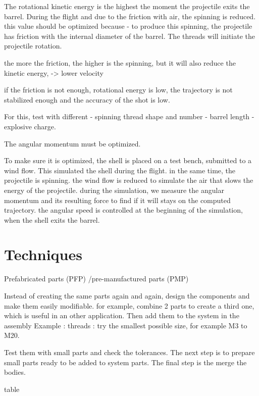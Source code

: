 \documentclass[12pt,a4paper]{article}
\begin{document}
	The rotational kinetic energy is the highest the moment the projectile exits the barrel. During the flight and due to the friction with air, the spinning is reduced.
	this value should be optimized because
	- to produce this spinning, the projectile has friction with the internal diameter of the barrel. The threads will initiate the projectile rotation. 
	
	the more the friction, the higher is the spinning, but it will also reduce the kinetic energy, -> lower velocity
	
	if the friction is not enough, rotational energy is low, the trajectory is not stabilized enough and the accuracy of the shot is low. 
	
	For this, test with different 
	- spinning thread shape and number
	- barrel length
	- explosive charge. 
	
	The angular momentum must be optimized.
	
	To make sure it is optimized, the shell is placed on a test bench, submitted to a wind flow. This simulated the shell during the flight. in the same time, the projectile is spinning. 
	the wind flow is reduced to simulate the air that slows the energy of the projectile. during the simulation, we measure the angular momentum and its resulting force to find if it will stays on the computed trajectory. 
	the angular speed is controlled at the beginning of the simulation, when the shell exits the barrel. 
	
	\newpage
	\section{Techniques}
	Prefabricated parts (PFP) /pre-manufactured parts (PMP)
	
	Instead of creating the same parts again and again, design the components and make them easily modifiable.
	for example, combine 2 parts to create a third one, which is useful in an other application. Then add them to the system in the assembly
	Example : threads : try the smallest possible size, for example M3 to M20. 
	
	Test them with small parts and check the tolerances. 
	The next step is to prepare small parts ready to be added to system parts. The final step is the merge the bodies. 
	
	
	table
	
\end{document}
